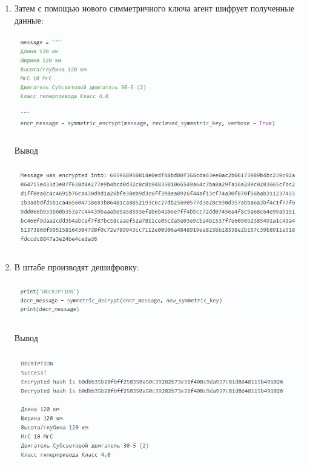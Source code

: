 \documentclass[12pt]{article}
\begin{document}
\begin{enumerate}
		\item Затем с помощью нового симметричного ключа агент шифрует полученные данные:
		
				\begin{center}
					\includegraphics[width=1\linewidth]{pictures/code13.jpg}
				\end{center}
			Вывод
				
				\begin{center}
					\includegraphics[width=1\linewidth]{pictures/code14.jpg}
				\end{center}
		\item В штабе производят дешифровку:
		
				\begin{center}
					\includegraphics[width=1\linewidth]{pictures/code15.jpg}
				\end{center}
			Вывод
				
				\begin{center}
					\includegraphics[width=1\linewidth]{pictures/code16.jpg}
				\end{center}
			

\end{enumerate}
\end{document}
